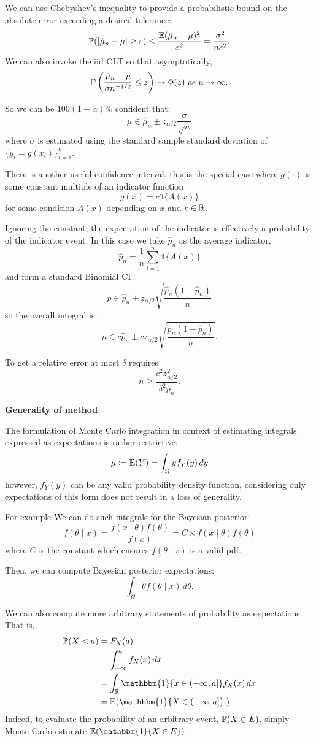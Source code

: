 \documentclass[10pt, a4paper]{article}
\begin{document}
We can use Chebyshev's inequality to provide a probabilistic bound on the absolute error exceeding a desired tolerance:
\[
\P(|\hat{\mu}_n - \mu| \geq \varepsilon) \leq \frac{\E(\hat{\mu}_n - \mu) ^ 2}{\varepsilon ^ 2} = \frac{\sigma ^ 2}{n\varepsilon ^ 2}.
\]
We can also invoke the iid CLT so that asymptotically,
\[
\P\left(\frac{\hat{\mu}_n - \mu}{\sigma n ^ {-1 / 2}} \leq z\right) \to \Phi(z)\text{ as } n \to \infty.
\]

So we can be $100(1 - \alpha)\%$ confident that:
\[
\mu \in \hat{\mu}_n \pm z_{\alpha / 2}\frac{\sigma}{\sqrt{n}}
\]
where $\sigma$ is estimated using the standard sample standard deviation of $\{y_i = g(x_i)\}_{i = 1}^{n}$.

There is another useful confidence interval,
this is the special case where $g(\cdot)$ is some constant multiple of an indicator function
\[
g(x) = c\mathbb{1}\{A(x)\}
\]
for some condition $A(x)$ depending on $x$ and $c \in \R$.

Ignoring the constant,
the expectation of the indicator is effectively a probability of the indicator event.
In this case we take $\hat{p}_n$ as the average indicator,
\[
\hat{p}_n = \frac{1}{n}\sum_{i = 1}^{n}\mathbb{1}\{A(x)\}
\]
and form a standard Binomial CI
\[
p \in \hat{p}_n \pm z_{\alpha / 2}\sqrt{\frac{\hat{p}_n(1 - \hat{p}_n)}{n}}
\]
so the overall integral is:
\[
\mu \in c\hat{p}_n \pm c z_{\alpha / 2}\sqrt{\frac{\hat{p}_n(1 - \hat{p}_n)}{n}}.
\]

To get a relative error at most $\delta$ requires
\[
n \geq \frac{c ^ 2z_{\alpha / 2} ^ 2}{\delta ^ 2\hat{p}_n}.
\]

\textbf{Generality of method}

The formulation of Monte Carlo integration in context of estimating integrals expressed as expectations is rather restrictive:
\[
\mu \coloneqq \E(Y) = \int_{\Omega}yf_{Y}(y)\,dy
\]
however,
$f_{Y}(y)$ can be any valid probability density function,
considering only expectations of this form does not result in a loss of generality.

For example We can do such integrals for the Bayesian posterior:
\[
f(\theta \mid x) = \frac{f(x \mid \theta)f(\theta)}{f(x)} = C \times f(x \mid \theta)f(\theta)
\]
where $C$ is the constant which ensures $f(\theta \mid x)$ is a valid pdf.

Then,
we can compute Bayesian posterior expectations:
\[
\int_{\Omega}\theta f(\theta \mid x)\,d\theta.
\]

We can also compute more arbitrary statements of probability as expectations.
That is,
\begin{align*}
    \P(X < a) &= F_{X}(a) \\
    &= \int_{-\infty}^{a}f_{X}(x)\,dx \\
    &= \int_{\R}\mathbbm{1}\{x \in (-\infty, a]\}f_{X}(x)\,dx \\
    &= \E(\mathbbm{1}\{X \in (-\infty, a]\}.)
\end{align*}
Indeed,
to evaluate the probability of an arbitrary event,
$\P(X \in E)$,
simply Monte Carlo estimate $\E(\mathbbm{1}\{X \in E\})$.
\end{document}
